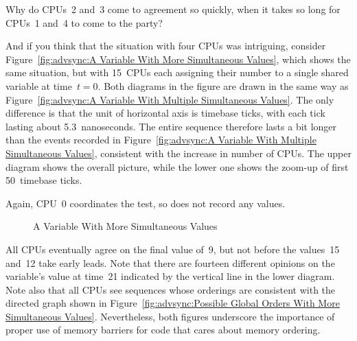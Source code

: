 \QuickQuiz{}
	Why do CPUs~2 and~3 come to agreement so quickly, when it
	takes so long for CPUs~1 and~4 to come to the party?
 \QuickQuizEnd

And if you think that the situation with four CPUs was intriguing, consider
Figure~\ref{fig:advsync:A Variable With More Simultaneous Values},
which shows the same situation, but with 15~CPUs each assigning their
number to a single shared variable at time~$t=0$. Both diagrams in the
figure are drawn in the same way as 
Figure~\ref{fig:advsync:A Variable With Multiple Simultaneous Values}.
The only difference is that the unit of horizontal axis is timebase ticks,
with each tick lasting about 5.3~nanoseconds.
The entire sequence therefore lasts a bit longer than the events recorded in
Figure~\ref{fig:advsync:A Variable With Multiple Simultaneous Values},
consistent with the increase in number of CPUs.
The upper diagram shows the overall picture, while the lower one shows
the zoom-up of first 50~timebase ticks.

Again, CPU~0 coordinates the test, so does not record any values.

\begin{figure*}
\centering
{}
\caption{A Variable With More Simultaneous Values}
\end{figure*}

All CPUs eventually agree on the final value of~9, but not before
the values~15 and~12 take early leads.
Note that there are fourteen different opinions on the variable's value
at time~21 indicated by the vertical line in the lower diagram.
Note also that all CPUs see sequences whose orderings are consistent with
the directed graph shown in
Figure~\ref{fig:advsync:Possible Global Orders With More Simultaneous Values}.
Nevertheless, both figures underscore the importance of
proper use of memory barriers for code that cares about memory ordering.

